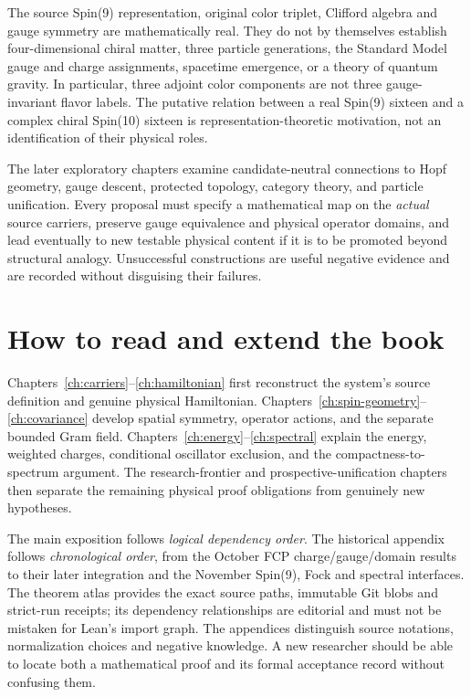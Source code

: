The source Spin(9) representation, original color triplet, Clifford
algebra and gauge symmetry are mathematically real. They do not by
themselves establish four-dimensional chiral matter, three particle
generations, the Standard Model gauge and charge assignments, spacetime
emergence, or a theory of quantum gravity. In particular, three adjoint
color components are not three gauge-invariant flavor labels. The
putative relation between a real Spin(9) sixteen and a complex chiral
Spin(10) sixteen is representation-theoretic motivation, not an
identification of their physical roles.

The later exploratory chapters examine candidate-neutral connections
to Hopf geometry, gauge descent, protected topology, category theory,
and particle unification. Every proposal must specify a mathematical
map on the \emph{actual} source carriers, preserve gauge equivalence
and physical operator domains, and lead eventually to new testable
physical content if it is to be promoted beyond structural analogy.
Unsuccessful constructions are useful negative evidence and are
recorded without disguising their failures.

\section{How to read and extend the book}

Chapters~\ref{ch:carriers}--\ref{ch:hamiltonian} first reconstruct the
system's source definition and genuine physical Hamiltonian.
Chapters~\ref{ch:spin-geometry}--\ref{ch:covariance} develop
spatial symmetry, operator actions, and the separate bounded Gram field.
Chapters~\ref{ch:energy}--\ref{ch:spectral} explain the energy,
weighted charges, conditional oscillator exclusion,
and the compactness-to-spectrum argument. The research-frontier and
prospective-unification chapters then separate the remaining physical
proof obligations from genuinely new hypotheses.

The main exposition follows \emph{logical dependency order}. The
historical appendix follows \emph{chronological order}, from the
October FCP charge/gauge/domain results to their later integration and
the November Spin(9), Fock and spectral interfaces. The theorem atlas
provides the exact source paths, immutable Git blobs and strict-run
receipts; its dependency relationships are editorial and must not be
mistaken for Lean's import graph. The appendices distinguish source
notations, normalization choices and negative knowledge. A new
researcher should be able to locate both a mathematical proof and
its formal acceptance record without confusing them.


